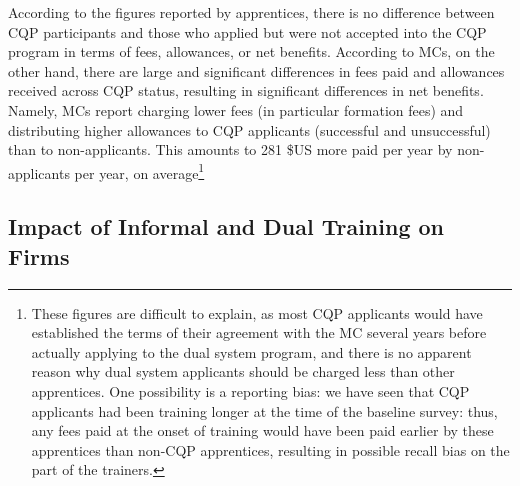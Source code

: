 \documentclass[
  11pt,
a4paper
]{report}
\begin{document}
According to the figures reported by apprentices, there is no difference between CQP participants and those who applied but were not accepted into the CQP program in terms of fees, allowances, or net benefits. According to MCs, on the other hand, there are large and significant differences in fees paid and allowances received across CQP status, resulting in significant differences in net benefits. Namely, MCs report charging lower fees (in particular formation fees) and distributing higher allowances to CQP applicants (successful and unsuccessful) than to non-applicants. This amounts to 281 \$US more paid per year by non-applicants per year, on average\footnote{These figures are difficult to explain, as most CQP applicants would have established the terms of their agreement with the MC several years before actually applying to the dual system program, and there is no apparent reason why dual system applicants should be charged less than other apprentices. One possibility is a reporting bias: we have seen that CQP applicants had been training longer at the time of the baseline survey: thus, any fees paid at the onset of training would have been paid earlier by these apprentices than non-CQP apprentices, resulting in possible recall bias on the part of the trainers.}

\hypertarget{firmimpact}{%
\subsection{Impact of Informal and Dual Training on Firms}\label{firmimpact}}
\end{document}
